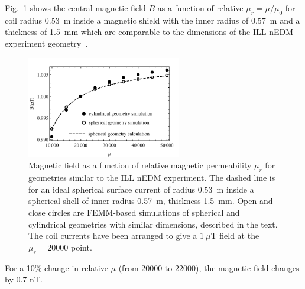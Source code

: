\documentclass[review]{elsarticle}
\begin{document}

%
Fig.~\ref{fig:Magnetic_Field} shows the central magnetic field $B$ as
a function of relative $\mu_r=\mu/\mu_0$ for coil radius 0.53~m inside a magnetic shield with the inner radius of $0.57$~m and a thickness of 1.5~mm which are
comparable to the dimensions of the ILL nEDM experiment
geometry~\cite{bib:baker,bib:knecht}.
\begin{figure}[h!]
\begin{center}
   \includegraphics[width=0.6\textwidth]{femm_and_calcs.pdf}
    \caption{Magnetic field as a function of relative magnetic
      permeability $\mu_r$ for geometries similar to the ILL nEDM
      experiment.  The dashed line is for an ideal spherical surface
      current of radius $0.53$~m inside a spherical shell of inner
      radius 0.57~m, thickness 1.5~mm.  Open and close circles are
      FEMM-based simulations of spherical and cylindrical geometries
      with similar dimensions, described in the text.  The coil
      currents have been arranged to give a $1~\mu$T field at the
      $\mu_r=20000$ point.}
    \label{fig:Magnetic_Field}
    \end{center}
\end{figure} 
For a 10\% change in relative $\mu$ (from 20000 to 22000), the
magnetic field changes by 0.7 nT.
\end{document}
